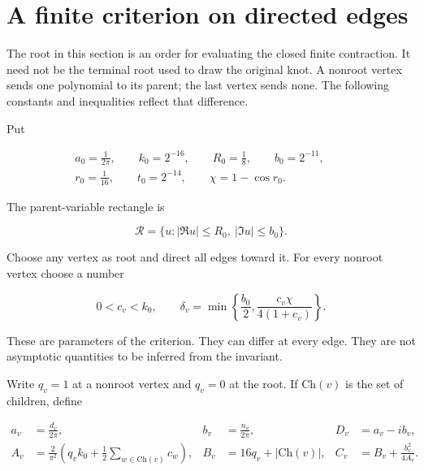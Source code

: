 \section{A finite criterion on directed edges}\label{dt:criterion}
The root in this section is an order for evaluating the closed finite
contraction. It need not be the terminal root used to draw the original
knot. A nonroot vertex sends one polynomial to its parent; the last
vertex sends none. The following constants and inequalities reflect
that difference.

Put

\begin{equation}\label{dt:eq-1}
\begin{gathered}
a_0=\frac1{2\pi},\qquad k_0=2^{-16},\qquad
 R_0=\frac18,\qquad b_0=2^{-11},\qquad\\
 r_0=\frac1{16},\qquad t_0=2^{-14},\qquad
 \chi=1-\cos r_0.
\end{gathered}
\end{equation}

The parent-variable rectangle is

\begin{equation}\label{dt:eq-2}
\mathcal R=\{u:|\Re u|\le R_0,\ |\Im u|\le b_0\}.
\end{equation}

Choose any vertex as root and direct all edges toward it. For every
nonroot vertex choose a number

\begin{equation}\label{dt:eq-3}
0<c_v<k_0,
 \qquad
 \delta_v=\min\left\{\frac{b_0}2,
               \frac{c_v\chi}{4(1+c_v)}\right\}.
\end{equation}

These are parameters of the criterion. They can differ at every edge.
They are not asymptotic quantities to be inferred from the invariant.

Write \(q_v=1\) at a nonroot vertex and \(q_v=0\) at the root. If \(\mathrm{Ch}(v)\) is the
set of children, define

\begin{equation}\label{dt:eq-4}
\begin{aligned}
 a_v&=\frac{d_v}{2\pi},& b_v&=\frac{n_v}{2\pi},&
 D_v&=a_v-i b_v,\\
 A_v&=\frac2{\pi^2}
       \left(q_vk_0+\frac12\sum_{w\in\mathrm{Ch}(v)}c_w\right),&
 B_v&=16q_v+|\mathrm{Ch}(v)|,&
 C_v&=B_v+\frac{b_v^2}{4A_v}.
\end{aligned}
\end{equation}

